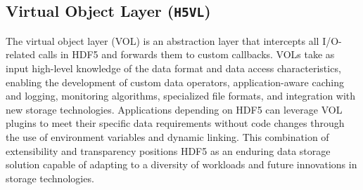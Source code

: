 \subsection{Virtual Object Layer (\texttt{H5VL})}\label{ref:vol}



The virtual object layer (VOL) is an abstraction layer that intercepts all I/O-related calls in HDF5 and forwards them to custom callbacks. VOLs take as input high-level knowledge of the data format and data access characteristics, enabling the development of custom data operators, application-aware caching and logging, monitoring algorithms, specialized file formats, and integration with new storage technologies. Applications depending on HDF5 can leverage VOL plugins to meet their specific data requirements without code changes through the use of environment variables and dynamic linking. This combination of extensibility and transparency positions HDF5 as an enduring data storage solution capable of adapting to a diversity of workloads and future innovations in storage technologies.

